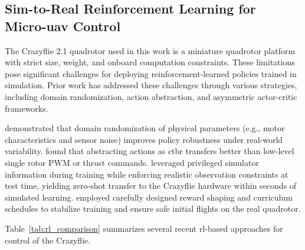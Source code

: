 \subsection{Sim-to-Real Reinforcement Learning for Micro-\gls{uav} Control}
The Crazyflie 2.1 quadrotor used in this work is a miniature quadrotor platform with strict size, weight, and onboard computation constraints. These limitations pose significant challenges for deploying reinforcement-learned policies trained in simulation. Prior work has addressed these challenges through various strategies, including domain randomization, action abstraction, and asymmetric actor-critic frameworks.

\cite{molchanov_sim--multi-real_2019} demonstrated that domain randomization of physical parameters (e.g., motor characteristics and sensor noise) improves policy robustness under real-world variability. \cite{kaufmann_benchmark_2022} found that abstracting actions as \gls{ctbr} transfers better than low-level single rotor PWM or thrust commands. \cite{eschmann_learning_2024} leveraged privileged simulator information during training while enforcing realistic observation constraints at test time, yielding zero-shot transfer to the Crazyflie hardware within seconds of simulated learning. \cite{chen_what_2024} employed carefully designed reward shaping and curriculum schedules to stabilize training and ensure safe initial flights on the real quadrotor.

Table~\ref{tab:rl_comparison} summarizes several recent \gls{rl}-based approaches for control of the Crazyflie.

